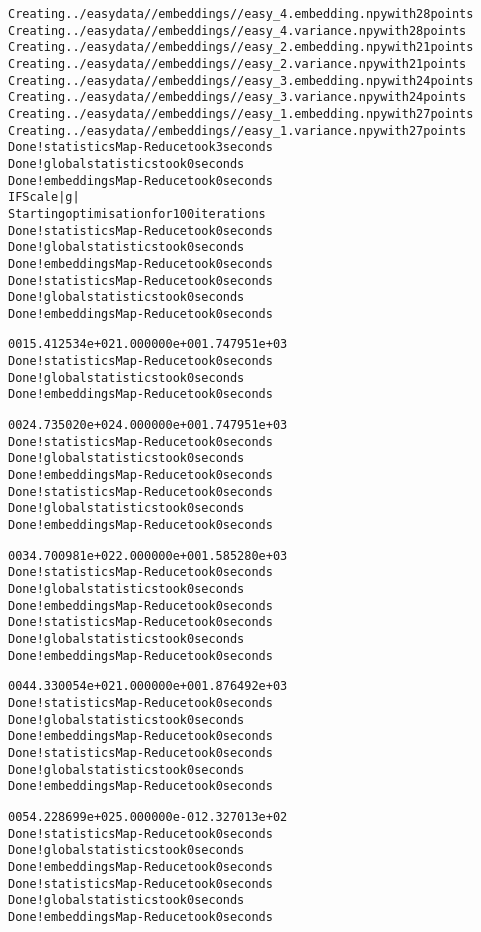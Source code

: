 \documentclass[letterpaper,10pt,english]{/usr/share/sphinx/texinputs/sphinxhowto}
\newenvironment{InvisibleVerbatim}
        {\begin{mdframed}[leftmargin=0.1\linewidth,innerleftmargin=3pt,innerrightmargin=3pt, userdefinedwidth=1\linewidth, linewidth=0pt, linecolor=white, usetwoside=false]}
        {\end{mdframed}}
\begin{document}
                \begin{InvisibleVerbatim}
                \vspace{-0.5\baselineskip}
\begin{alltt}Creating ../easydata//embeddings//easy\_4.embedding.npy with 28 points
Creating ../easydata//embeddings//easy\_4.variance.npy with 28 points
Creating ../easydata//embeddings//easy\_2.embedding.npy with 21 points
Creating ../easydata//embeddings//easy\_2.variance.npy with 21 points
Creating ../easydata//embeddings//easy\_3.embedding.npy with 24 points
Creating ../easydata//embeddings//easy\_3.variance.npy with 24 points
Creating ../easydata//embeddings//easy\_1.embedding.npy with 27 points
Creating ../easydata//embeddings//easy\_1.variance.npy with 27 points
Done! statistics Map-Reduce took  3  seconds
Done! global statistics took  0  seconds
Done! embeddings Map-Reduce took  0  seconds
 I     F              Scale          |g|
Starting optimisation for 100 iterations
Done! statistics Map-Reduce took  0  seconds
Done! global statistics took  0  seconds
Done! embeddings Map-Reduce took  0  seconds
Done! statistics Map-Reduce took  0  seconds
Done! global statistics took  0  seconds
Done! embeddings Map-Reduce took  0  seconds

 001   5.412534e+02   1.000000e+00   1.747951e+03
Done! statistics Map-Reduce took  0  seconds
Done! global statistics took  0  seconds
Done! embeddings Map-Reduce took  0  seconds

 002   4.735020e+02   4.000000e+00   1.747951e+03
Done! statistics Map-Reduce took  0  seconds
Done! global statistics took  0  seconds
Done! embeddings Map-Reduce took  0  seconds
Done! statistics Map-Reduce took  0  seconds
Done! global statistics took  0  seconds
Done! embeddings Map-Reduce took  0  seconds

 003   4.700981e+02   2.000000e+00   1.585280e+03
Done! statistics Map-Reduce took  0  seconds
Done! global statistics took  0  seconds
Done! embeddings Map-Reduce took  0  seconds
Done! statistics Map-Reduce took  0  seconds
Done! global statistics took  0  seconds
Done! embeddings Map-Reduce took  0  seconds

 004   4.330054e+02   1.000000e+00   1.876492e+03
Done! statistics Map-Reduce took  0  seconds
Done! global statistics took  0  seconds
Done! embeddings Map-Reduce took  0  seconds
Done! statistics Map-Reduce took  0  seconds
Done! global statistics took  0  seconds
Done! embeddings Map-Reduce took  0  seconds

 005   4.228699e+02   5.000000e-01   2.327013e+02
Done! statistics Map-Reduce took  0  seconds
Done! global statistics took  0  seconds
Done! embeddings Map-Reduce took  0  seconds
Done! statistics Map-Reduce took  0  seconds
Done! global statistics took  0  seconds
Done! embeddings Map-Reduce took  0  seconds


\end{alltt}
\end{InvisibleVerbatim}
\end{document}

